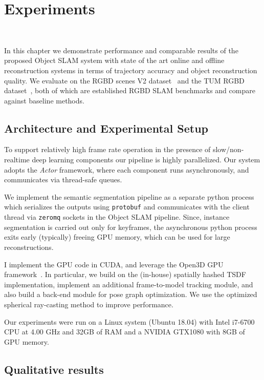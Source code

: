 \chapter{Experiments}~\label{chap:experiments}

In this chapter we demonstrate performance and comparable results of the proposed Object SLAM system with state of the art online and offline reconstruction systems in terms of trajectory accuracy and object reconstruction quality. We evaluate on the RGBD scenes V2 dataset~\cite{laiUnsupervisedFeatureLearning2014} and the TUM RGBD dataset~\cite{sturmBenchmarkEvaluationRGBD2012}, both of which are established RGBD SLAM benchmarks and compare against baseline methods.

\section{Architecture and Experimental Setup}


To support relatively high frame rate operation in the presence of slow/non-realtime deep learning components our pipeline is highly parallelized. Our system adopts the \textit{Actor} framework, where each component runs asynchronously, and communicates via thread-safe queues.

We implement the semantic segmentation pipeline as a separate python process which serializes the outputs using \texttt{protobuf} and communicates with the client thread via \texttt{zeromq} sockets in the Object SLAM pipeline. Since, instance segmentation is carried out only for keyframes, the asynchronous python process exits early (typically) freeing GPU memory, which can be used for large reconstructions.

I implement the GPU code in CUDA, and leverage the Open3D GPU framework~\cite{dongGPUAcceleratedRobust2019}. In particular, we build on the (in-house) spatially hashed TSDF implementation, implement an additional frame-to-model tracking module, and also build a back-end module for pose graph optimization. We use the optimized spherical ray-casting method to improve performance.

Our experiments were run on a Linux system (Ubuntu 18.04) with Intel i7-6700 CPU at 4.00 GHz and 32GB of RAM and a NVIDIA GTX1080 with 8GB of GPU memory.

\section{Qualitative results}

